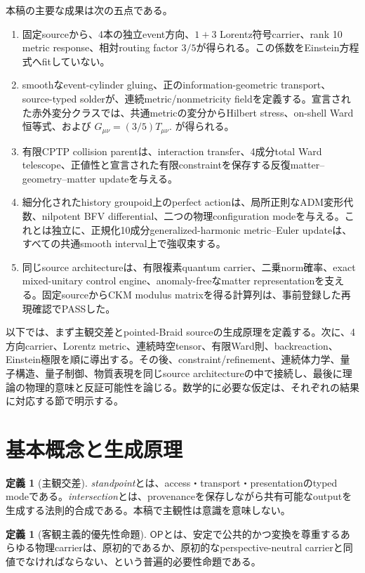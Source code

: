 \documentclass[11pt]{article}
\theoremstyle{definition}
\newtheorem{definition}[theorem]{定義}
\theoremstyle{remark}
\newcommand{\OPT}{\mathsf{OP}}
\begin{document}
本稿の主要な成果は次の五点である。
\begin{enumerate}[label=(\roman*)]
  \item 固定sourceから、4本の独立event方向、$1+3$ Lorentz符号carrier、rank 10 metric response、相対routing factor $3/5$が得られる。この係数をEinstein方程式へfitしていない。
  \item smoothなevent-cylinder gluing、正のinformation-geometric transport、source-typed solderが、連続metric/nonmetricity fieldを定義する。宣言された赤外変分クラスでは、共通metricの変分からHilbert stress、on-shell Ward恒等式、および
  $G_{\mu\nu}=(3/5)T_{\mu\nu}$.
  が得られる。
  \item 有限CPTP collision parentは、interaction transfer、4成分total Ward telescope、正値性と宣言された有限constraintを保存する反復matter--geometry--matter updateを与える。
  \item 細分化されたhistory groupoid上のperfect actionは、局所正則なADM変形代数、nilpotent BFV differential、二つの物理configuration modeを与える。これとは独立に、正規化10成分generalized-harmonic metric--Euler updateは、すべての共通smooth interval上で強収束する。
  \item 同じsource architectureは、有限複素quantum carrier、二乗norm確率、exact mixed-unitary control engine、anomaly-freeなmatter representationを支える。固定sourceからCKM modulus matrixを得る計算列は、事前登録した再現確認でPASSした。
\end{enumerate}

以下では、まず主観交差とpointed-Braid sourceの生成原理を定義する。次に、4方向carrier、Lorentz metric、連続時空tensor、有限Ward則、backreaction、Einstein極限を順に導出する。その後、constraint/refinement、連続体力学、量子構造、量子制御、物質表現を同じsource architectureの中で接続し、最後に理論の物理的意味と反証可能性を論じる。数学的に必要な仮定は、それぞれの結果に対応する節で明示する。

\section{基本概念と生成原理}

\begin{definition}[主観交差]
\emph{standpoint}とは、access・transport・presentationのtyped modeである。\emph{intersection}とは、provenanceを保存しながら共有可能なoutputを生成する法則的合成である。本稿で主観性は意識を意味しない。
\end{definition}

\begin{definition}[客観主義的優先性命題]
$\OPT$とは、安定で公共的かつ変換を尊重するあらゆる物理carrierは、原初的であるか、原初的なperspective-neutral carrierと同値でなければならない、という普遍的必要性命題である。
\end{definition}
\end{document}
